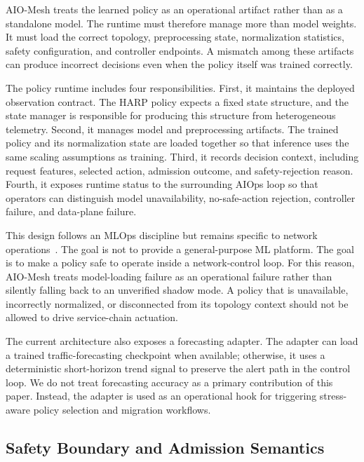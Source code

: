 \documentclass[final,5p]{elsarticle}
\begin{document}
AIO-Mesh treats the learned policy as an operational artifact rather than as a standalone model. The runtime must therefore manage more than model weights. It must load the correct topology, preprocessing state, normalization statistics, safety configuration, and controller endpoints. A mismatch among these artifacts can produce incorrect decisions even when the policy itself was trained correctly.

The policy runtime includes four responsibilities. First, it maintains the deployed observation contract. The HARP policy expects a fixed state structure, and the state manager is responsible for producing this structure from heterogeneous telemetry. Second, it manages model and preprocessing artifacts. The trained policy and its normalization state are loaded together so that inference uses the same scaling assumptions as training. Third, it records decision context, including request features, selected action, admission outcome, and safety-rejection reason. Fourth, it exposes runtime status to the surrounding AIOps loop so that operators can distinguish model unavailability, no-safe-action rejection, controller failure, and data-plane failure.

This design follows an MLOps discipline but remains specific to network operations~\cite{kreuzberger2023mlops,eken2025mlops,bayram2025trustworthy}. The goal is not to provide a general-purpose ML platform. The goal is to make a policy safe to operate inside a network-control loop. For this reason, AIO-Mesh treats model-loading failure as an operational failure rather than silently falling back to an unverified shadow mode. A policy that is unavailable, incorrectly normalized, or disconnected from its topology context should not be allowed to drive service-chain actuation.

The current architecture also exposes a forecasting adapter. The adapter can load a trained traffic-forecasting checkpoint when available; otherwise, it uses a deterministic short-horizon trend signal to preserve the alert path in the control loop. We do not treat forecasting accuracy as a primary contribution of this paper. Instead, the adapter is used as an operational hook for triggering stress-aware policy selection and migration workflows.

\subsection{Safety Boundary and Admission Semantics}
\label{subsec:safety_boundary}
\end{document}
